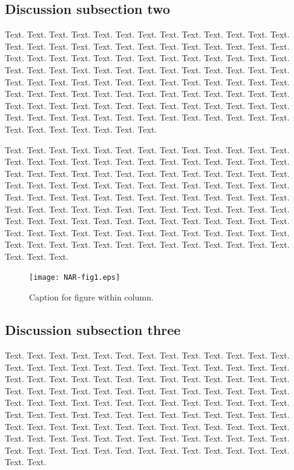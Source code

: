 \documentclass[a4,center,fleqn]{NAR}
\begin{document}
\subsection{Discussion subsection two}

Text. Text. Text. Text. Text. Text. Text. Text. Text. Text. Text.
Text. Text. Text. Text. Text. Text. Text. Text. Text. Text. Text.
Text. Text. Text. Text. Text. Text. Text. Text. Text. Text. Text.
Text. Text. Text. Text. Text. Text. Text. Text. Text. Text. Text.
Text. Text. Text. Text. Text. Text. Text. Text. Text. Text. Text.
Text. Text. Text. Text. Text. Text. Text. Text. Text. Text. Text.
Text. Text. Text. Text. Text. Text. Text. Text. Text. Text. Text.
Text. Text. Text. Text. Text. Text. Text. Text. Text. Text. Text.
Text. Text. Text. Text. Text. Text. Text. Text. Text. Text. Text.
Text. Text. Text. Text. Text. Text. Text. Text. Text. Text. Text.
Text.

Text. Text. Text. Text. Text. Text. Text. Text. Text. Text. Text.
Text. Text. Text. Text. Text. Text. Text. Text. Text. Text. Text.
Text. Text. Text. Text. Text. Text. Text. Text. Text. Text. Text.
Text. Text. Text. Text. Text. Text. Text. Text. Text. Text. Text.
Text. Text. Text. Text. Text. Text. Text. Text. Text. Text. Text.
Text. Text. Text. Text. Text. Text. Text. Text. Text. Text. Text.
Text. Text. Text. Text. Text. Text. Text. Text. Text. Text. Text.
Text. Text. Text. Text. Text. Text. Text. Text. Text. Text. Text.
Text. Text. Text. Text. Text. Text. Text. Text. Text. Text. Text.
Text. Text. Text. Text. Text. Text. Text. Text. Text. Text. Text.
Text. Text. Text. Text. Text. Text. Text. Text. Text. Text.


\begin{figure}[t]
\begin{center}
\texttt{[image: NAR-fig1.eps]}
\end{center}
\caption{Caption for figure within column.}
\label{NAR-fig1}
\end{figure}

\subsection{Discussion subsection three}

Text. Text. Text. Text. Text. Text. Text. Text. Text. Text. Text.
Text. Text. Text. Text. Text. Text. Text. Text. Text. Text. Text.
Text. Text. Text. Text. Text. Text. Text. Text. Text. Text. Text.
Text. Text. Text. Text. Text. Text. Text. Text. Text. Text. Text.
Text. Text. Text. Text. Text. Text. Text. Text. Text. Text. Text.
Text. Text. Text. Text. Text. Text. Text. Text. Text. Text. Text.
Text. Text. Text. Text. Text. Text. Text. Text. Text. Text. Text.
Text. Text. Text. Text. Text. Text. Text. Text. Text. Text. Text.
Text. Text. Text. Text. Text. Text. Text. Text. Text. Text. Text.
Text. Text. Text. Text. Text. Text. Text. Text. Text. Text. Text.
Text. Text. Text. Text. Text. Text. Text. Text. Text.
\end{document}
